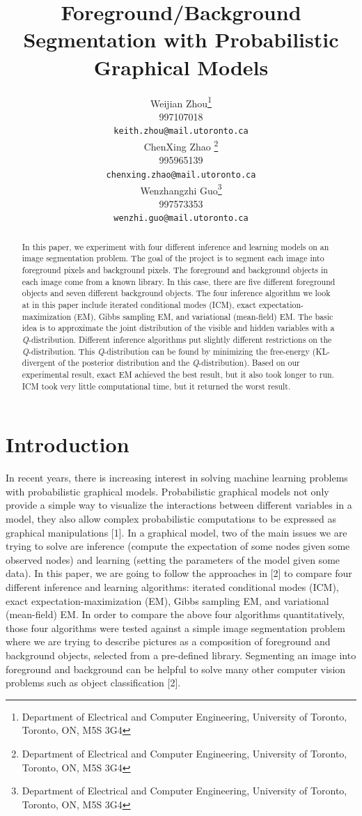 \documentclass{article} %
\title{Foreground/Background Segmentation with Probabilistic Graphical Models}
\author{
Weijian Zhou\thanks{Department of Electrical and Computer Engineering, University of Toronto, Toronto, ON, M5S 3G4} \\
997107018 \\
\texttt{keith.zhou@mail.utoronto.ca} \\
\And
ChenXing Zhao \thanks{Department of Electrical and Computer Engineering, University of Toronto, Toronto, ON, M5S 3G4} \\
995965139\\
\texttt{chenxing.zhao@mail.utoronto.ca} \\
\AND
Wenzhangzhi Guo\thanks{Department of Electrical and Computer Engineering, University of Toronto, Toronto, ON, M5S 3G4} \\
997573353 \\
\texttt{wenzhi.guo@mail.utoronto.ca} \\
}
\begin{document}
\maketitle

\begin{abstract}
In this paper, we experiment with four different inference and learning models on an image segmentation problem. The goal of the project is to segment each image into foreground pixels and background pixels. The foreground and background objects in each image come from a known library. In this case, there are five different foreground objects and seven different background objects. The four inference algorithm we look at in this paper include iterated conditional modes (ICM), exact expectation-maximization (EM), Gibbs sampling EM, and variational (mean-field) EM. The basic idea is to approximate the joint distribution of the visible and hidden variables with a \textit{Q}-distribution. Different inference algorithms put slightly different restrictions on the \textit{Q}-distribution. This \textit{Q}-distribution can be found by minimizing the free-energy (KL-divergent of the posterior distribution and the \textit{Q}-distribution).  Based on our experimental result, exact EM achieved the best result, but it also took longer to run. ICM took very little computational time, but it returned the worst result. 
\end{abstract}

\section{Introduction}
\label{intro}
In recent years, there is increasing interest in solving machine learning problems with probabilistic graphical models. Probabilistic graphical models not only provide a simple way to visualize the interactions between different variables in a model, they also allow complex probabilistic computations to be expressed as graphical manipulations [1]. In a graphical model, two of the main issues we are trying to solve are inference (compute the expectation of some nodes given some observed nodes) and learning (setting the parameters of the model given some data). In this paper, we are going to follow the approaches in [2] to compare four different inference and learning algorithms: iterated conditional modes (ICM), exact expectation-maximization (EM), Gibbs sampling EM, and variational (mean-field) EM. In order to compare the above four algorithms quantitatively, those four algorithms were tested against a simple image segmentation problem where we are trying to describe pictures as a composition of foreground and background objects, selected from a pre-defined library. Segmenting an image into foreground and background can be helpful to solve many other computer vision problems such as object classification [2].
\end{document}
